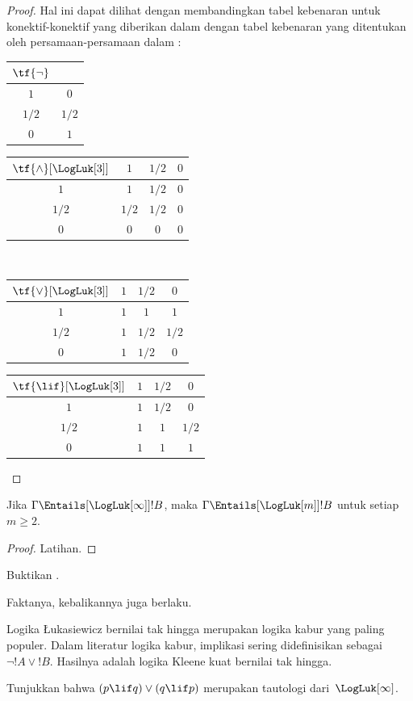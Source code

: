 \documentclass[../../../include/open-logic-section]{subfiles}
\begin{document}
\begin{proof}
  Hal ini dapat dilihat dengan membandingkan tabel kebenaran untuk
  konektif-konektif yang diberikan dalam
   dengan tabel kebenaran yang ditentukan
  oleh persamaan-persamaan dalam :
  \begin{center}
    \begin{tabular}{c|c} 
      $\tf{\lnot}$ & \\ 
      \hline  
      $1$ & $0$ \\ 
      $1/2$ & $1/2$ \\
      $0$ & $1$ 
    \end{tabular}
    \quad
    \begin{tabular}{c|ccc} 
      $\tf{\land}[\LogLuk[3]]$ & $1$ & $1/2$ & $0$ \\ 
      \hline 
      $1$ & $1$ & $1/2$ & $0$ \\ 
      $1/2$ & $1/2$ & $1/2$ & $0$\\ 
      $0$ & $0$ & $0$ & $0$ 
    \end{tabular}
    \\[2ex]
    \begin{tabular}{c|ccc} 
      $\tf{\lor}[\LogLuk[3]]$ & $1$ & $1/2$ & $0$ \\ 
      \hline 
      $1$ & $1$ & $1$ & $1$ \\ 
      $1/2$ & $1$ & $1/2$ & $1/2$ \\
      $0$ & $1$ & $1/2$ & $0$ 
    \end{tabular}
    \quad
    \begin{tabular}{c|ccc} 
      $\tf{\lif}[\LogLuk[3]]$ & $1$ & $1/2$ & $0$ \\ 
      \hline 
      $1$ & $1$ & $1/2$ & $0$ \\ 
      $1/2$ & $1$ & $1$ & $1/2$  \\ 
      $0$ & $1$ & $1$ & $1$ 
    \end{tabular}
  \end{center} 
\end{proof}

\begin{prop}
  Jika $\Gamma \Entails[\LogLuk[\infty]] !B$, maka $\Gamma
  \Entails[\LogLuk[m]] !B$ untuk setiap~$m \ge 2$.
\end{prop}

\begin{proof}
  Latihan.
\end{proof}

\begin{prob}
  Buktikan .
\end{prob}

Faktanya, kebalikannya juga berlaku.

Logika \L ukasiewicz bernilai tak hingga merupakan logika kabur yang paling
populer. Dalam literatur logika kabur, implikasi sering didefinisikan sebagai
$\lnot !A \lor !B$. Hasilnya adalah logika Kleene kuat bernilai tak hingga.

\begin{prob}
  Tunjukkan bahwa $(p \lif q) \lor (q \lif p)$ merupakan tautologi
  dari~$\LogLuk[\infty]$.
\end{prob}
\end{document}
